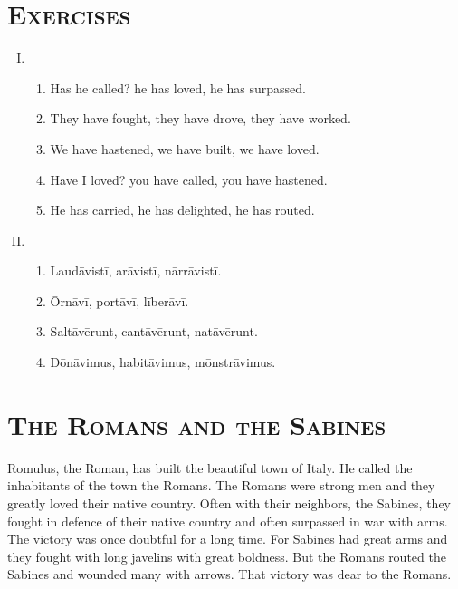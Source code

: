 \documentclass[12pt]{article}
\begin{document}
\section{\textsc{Exercises}}
\begin{enumerate}[I.]
	\setlength{\itemsep}{1em}
	\item \begin{enumerate}[1)]
		\item Has he called? he has loved, he has surpassed.
		\item They have fought, they have drove, they have worked.
		\item We have hastened, we have built, we have loved.
		\item Have I loved? you have called, you have hastened.
		\item He has carried, he has delighted, he has routed.
	\end{enumerate}
	\item \begin{enumerate}[1)]
		\item Laudāvistī, arāvistī, nārrāvistī.
		\item Ōrnāvī, portāvī, līberāvī.
		\item Saltāvērunt, cantāvērunt, natāvērunt.
		\item Dōnāvimus, habitāvimus, mōnstrāvimus.
	\end{enumerate}
\end{enumerate}

\section{\textsc{The Romans and the Sabines}}

\hspace{\parindent} Romulus, the Roman, has built the beautiful town of Italy. He called the inhabitants of the town the Romans. The Romans were strong men and they greatly loved their native country. Often with their neighbors, the Sabines, they fought in defence of their native country and often surpassed in war with arms. The victory was once doubtful for a long time. For Sabines had great arms and they fought with long javelins with great boldness. But the Romans routed the Sabines and wounded many with arrows. That victory was dear to the Romans.
\end{document}
